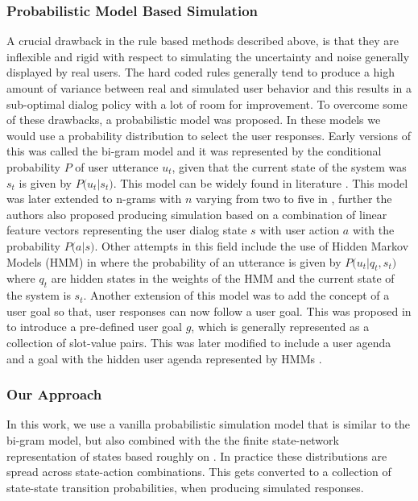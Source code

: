 \documentclass[12pt]{extarticle}
\numberwithin{equation}{section}
\begin{document}
	\subsubsection{Probabilistic Model Based Simulation}	
	A crucial drawback in the rule based methods described above, is that they are inflexible and rigid with respect to simulating the uncertainty and noise generally displayed by real users. The hard coded rules generally tend to produce a high amount of variance between real and simulated user behavior and this results in a sub-optimal dialog policy with a lot of room for improvement. To overcome some of these drawbacks, a probabilistic model was proposed. In these models we would use a probability distribution to select the user responses. Early versions of this was called the bi-gram model and it was represented by the conditional probability $P$ of user utterance $u_t$, given that the current state of the system was $s_t$ is given by $P\big(u_t|s_t\big)$. This model can be widely found in literature \cite{Cuayhuitl2006LearningMD}\cite{levin_mdp}\cite{4430164}. This model was later extended to n-grams with $n$ varying from two to five in \cite{Georgila2006UserSF}, further the authors also proposed producing simulation based on a combination of linear feature vectors representing the user dialog state $s$ with user action $a$ with the probability $P\big(a|s\big)$. Other attempts in this field include the use of Hidden Markov Models (HMM) in \cite{Cuayhuitl2005HumancomputerDS} where the probability of an utterance is given by $P\big(u_t|q_t,s_t\big)$ where $q_t$ are hidden states in the weights of the HMM and the current state of the system is $s_t$. Another extension of this model was to add the concept of a user goal so that, user responses can now follow a user goal. This was proposed in \cite{Scheffler_sim} to introduce a pre-defined user goal $g$, which is generally represented as a collection of slot-value pairs. This was later modified to include a user agenda and a goal with the hidden user agenda represented by HMMs \cite{Schatzmann2007StatisticalUS}.
	\subsubsection{Our Approach}
	In this work, we use a vanilla probabilistic simulation model that is similar to the bi-gram model, but also combined with the the finite state-network representation of states based roughly on \cite{Scheffler_sim}. In practice these distributions are spread across state-action combinations. This gets converted to a collection of state-state transition probabilities, when producing simulated responses.
\end{document}
